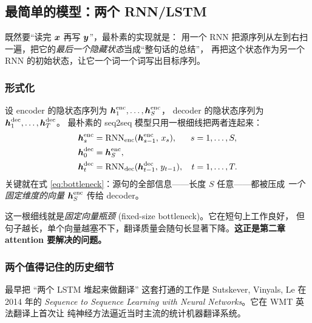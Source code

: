 \subsection{最简单的模型：两个 RNN/LSTM}
\label{sec:two-rnns}

\begin{intuitionblock}
既然要“读完 $\boldsymbol{x}$ 再写 $\boldsymbol{y}$”，最朴素的实现就是：
用一个 RNN 把源序列从左到右扫一遍，把它的\emph{最后一个隐藏状态}当成“整句话的总结”，
再把这个状态作为另一个 RNN 的初始状态，让它一个词一个词写出目标序列。
\end{intuitionblock}

\subsubsection{形式化}

设 encoder 的隐状态序列为 $\boldsymbol{h}_1^{\text{enc}}, \dots, \boldsymbol{h}_S^{\text{enc}}$，
decoder 的隐状态序列为 $\boldsymbol{h}_1^{\text{dec}}, \dots, \boldsymbol{h}_T^{\text{dec}}$。
最朴素的 seq2seq 模型只用一根细线把两者连起来：
\begin{align}
    \boldsymbol{h}_s^{\text{enc}} &= \mathrm{RNN}_{\text{enc}}(\boldsymbol{h}_{s-1}^{\text{enc}},\, x_s),
        & s &= 1, \dots, S, \\
    \boldsymbol{h}_0^{\text{dec}} &= \boldsymbol{h}_S^{\text{enc}}, \label{eq:bottleneck}\\
    \boldsymbol{h}_t^{\text{dec}} &= \mathrm{RNN}_{\text{dec}}(\boldsymbol{h}_{t-1}^{\text{dec}},\, y_{t-1}),
        & t &= 1, \dots, T.
\end{align}
关键就在式 \eqref{eq:bottleneck}：源句的全部信息——长度 $S$ 任意——都被压成
\emph{一个固定维度的向量} $\boldsymbol{h}_S^{\text{enc}}$ 传给 decoder。

\begin{keypointblock}
这一根细线就是\emph{固定向量瓶颈} (fixed-size bottleneck)。它在短句上工作良好，
但句子越长，单个向量越塞不下，翻译质量会随句长显著下降。\textbf{这正是第二章 attention 要解决的问题。}
\end{keypointblock}

\subsubsection{两个值得记住的历史细节}

\begin{remark}[Sutskever 等人 2014]
最早把 “两个 LSTM 堆起来做翻译” 这套打通的工作是 Sutskever, Vinyals, Le 在 2014 年的
\emph{Sequence to Sequence Learning with Neural Networks}。它在 WMT 英法翻译上首次让
纯神经方法逼近当时主流的统计机器翻译系统。
\end{remark}


